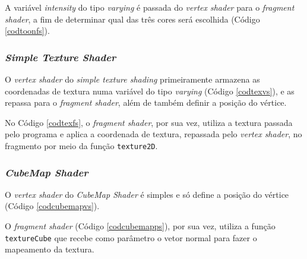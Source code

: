 	

	A variável \textit{intensity} do tipo \textit{varying} é passada do \textit{vertex shader} para o \textit{fragment shader}, a fim de determinar qual das três cores será escolhida (Código \ref{codtoonfs}). 
  
 	

\subsubsection{\textit{Simple Texture Shader}}

	O \textit{vertex shader} do \textit{simple texture shading} primeiramente armazena as coordenadas de textura numa variável do tipo \textit{varying} (Código \ref{codtexvs}), e as repassa para o \textit{fragment shader}, além de também definir a posição do vértice.  

	

	No Código \ref{codtexfs}, o \textit{fragment shader}, por sua vez, utiliza a textura passada pelo programa e aplica a coordenada de textura, repassada pelo \textit{vertex shader}, no fragmento por meio da função  \texttt{texture2D}.

	

\subsubsection{\textit{CubeMap Shader}}	

	 O \textit{vertex shader} do \textit{CubeMap Shader} é simples e só define a posição do vértice (Código \ref{codcubemapvs}). 

	

	O  \textit{fragment shader} (Código \ref{codcubemapps}), por sua vez, utiliza a função \texttt{textureCube} que recebe como parâmetro o vetor normal para fazer o mapeamento da textura. 

